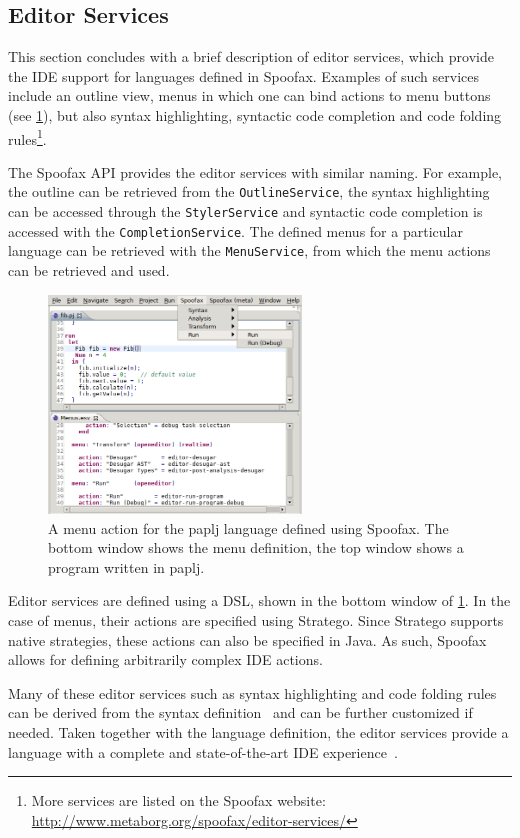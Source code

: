 \subsection{Editor Services}
\label{ssec:editor-serv}
This section concludes with a brief description of editor services,
which provide the IDE support for languages defined in
Spoofax. Examples of such services include an outline view, menus in
which one can bind actions to menu buttons (see
\cref{fig:menu-actions}), but also syntax highlighting, syntactic code
completion and code folding rules\footnote{More services are
listed on the Spoofax website:
\url{http://www.metaborg.org/spoofax/editor-services/}}.

The Spoofax API provides the editor services with similar naming. For
example, the outline can be retrieved from the \texttt{OutlineService}, the
syntax highlighting can be accessed through the \texttt{StylerService} and
syntactic code completion is accessed with the
\texttt{CompletionService}. The defined menus for a particular language can
be retrieved with the \texttt{MenuService}, from which the menu actions can
be retrieved and used.

\begin{figure}[bt]
\centering
\includegraphics[width=0.6\textwidth]{./img/menu-actions.png}
\caption{\label{fig:menu-actions}
A menu action for the paplj language defined using Spoofax. The bottom window shows the menu definition, the top window shows a program written in paplj.}
\end{figure}

Editor services are defined using a DSL, shown in the bottom window of
\cref{fig:menu-actions}. In the case of menus, their actions are
specified using Stratego. Since Stratego supports native strategies,
these actions can also be specified in Java. As such, Spoofax allows
for defining arbitrarily complex IDE actions.

Many of these editor services such as syntax highlighting and code
folding rules can be derived from the syntax
definition~\cite{Kats10c} and can be further customized if
needed. Taken together with the language definition, the editor
services provide a language with a complete and state-of-the-art IDE
experience~\cite{Kats10a}.
